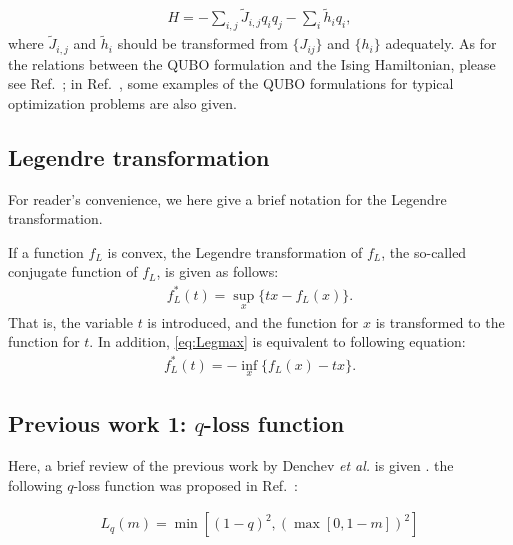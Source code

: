 \documentclass[fp,twocolumn]{jpsj3}
\begin{document}
\begin{eqnarray}
  H=-\sum_{i,j}{\widetilde{J}_{i,j}q_{i}q_{j}}-\sum_{i}{\widetilde{h}_{i}q_{i}},
\end{eqnarray}
where $\widetilde{J}_{i,j}$ and $\widetilde{h}_{i}$ should be transformed from $\{J_{ij}\}$ and $\{h_{i}\}$ adequately.
As for the relations between the QUBO formulation and the Ising Hamiltonian, please see Ref.~;
in Ref.~, some examples of the QUBO formulations for typical optimization problems are also given.




\subsection{Legendre transformation}

For reader's convenience, we here give a brief notation for the Legendre transformation.

If a function $f_{L}$ is convex, the Legendre transformation of $f_{L}$, the so-called conjugate function of $f_{L}$, is given as follows:
\begin{align}
\label{eq:Legmax}
f_{L}^{*}(t)=\sup_{x}\{t x - f_{L}(x)\}.
\end{align}
That is, the variable $t$ is introduced, and the function for $x$ is transformed to the function for $t$.
In addition, \eqref{eq:Legmax} is equivalent to following equation:
\begin{align}
\label{eq:Legmin}
f_{L}^{*}(t)=-\inf_{x}\{f_{L}(x) - t x\}.
\end{align}


\subsection{Previous work 1: $q$-loss function}

Here, a brief review of the previous work by Denchev \textit{et al.} is given \cite{q-loss}.
the following $q$-loss function was proposed in Ref.~:

\begin{eqnarray}
  L_{q}(m)=\min{[(1-q)^{2}, (\max{[0,1-m]})^{2}]} \label{q-loss_function}
\end{eqnarray}
\end{document}
